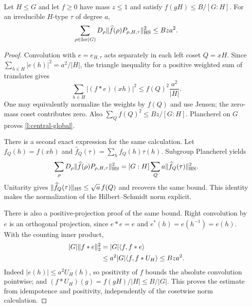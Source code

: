 \begin{lemma}\label{l:central-isotypic}
Let $H\le G$ and let $f\ge0$ have mass $z\le1$ and satisfy $f(gH)\le B/[G:H]$. For an irreducible $H$-type $\tau$ of degree $a$,
\begin{equation}\label{l:central-global}
 \sum_{\rho\in\operatorname{Irr}(G)}D_\rho\|\widehat f(\rho)P_{\rho,H,\tau}\|_{\mathrm{HS}}^2\le Bza^2.
\end{equation}
\end{lemma}
\begin{proof}
Convolution with $e=e_{H,\tau}$ acts separately in each left coset $Q=xH$. Since $\sum_{h\in H}|e(h)|^2=a^2/|H|$, the triangle inequality for a positive weighted sum of translates gives
\[
 \sum_{h\in H}|(f*e)(xh)|^2\le f(Q)^2\frac{a^2}{|H|}.
\]
One may equivalently normalize the weights by $f(Q)$ and use Jensen; the zero-mass coset contributes zero. Also $\sum_Q f(Q)^2\le Bz/[G:H]$. Plancherel on $G$ proves \eqref{l:central-global}.

There is a second exact expression for the same calculation. Let $f_Q(h)=f(xh)$ and $\widehat f_Q(\tau)=\sum_hf_Q(h)\tau(h)$. Subgroup Plancherel yields
\[
 \sum_\rho D_\rho\|\widehat f(\rho)P_{\rho,H,\tau}\|_{\mathrm{HS}}^2
 =[G:H]\sum_Q a\|\widehat f_Q(\tau)\|_{\mathrm{HS}}^2.
\]
Unitarity gives $\|\widehat f_Q(\tau)\|_{\mathrm{HS}}\le\sqrt a\,f(Q)$ and recovers the same bound. This identity makes the normalization of the Hilbert--Schmidt norm explicit.

There is also a positive-projection proof of the same bound.
Right convolution by $e$ is an orthogonal projection, since $e*e=e$ and $e^*(h)=\overline{e(h^{-1})}=e(h)$. With the counting inner product,
\begin{align}
 |G|\|f*e\|_2^2
 &=|G|\langle f,f*e\rangle\notag\\
 &\le a^2|G|\langle f,f*U_H\rangle
 \le Bza^2.\label{l:isotypic-positive-projection}
\end{align}
Indeed $|e(h)|\le a^2U_H(h)$, so positivity of $f$ bounds the absolute convolution pointwise; and $(f*U_H)(g)=f(gH)/|H|\le B/|G|$. This proves the estimate from idempotence and positivity, independently of the cosetwise norm calculation.
\end{proof}

